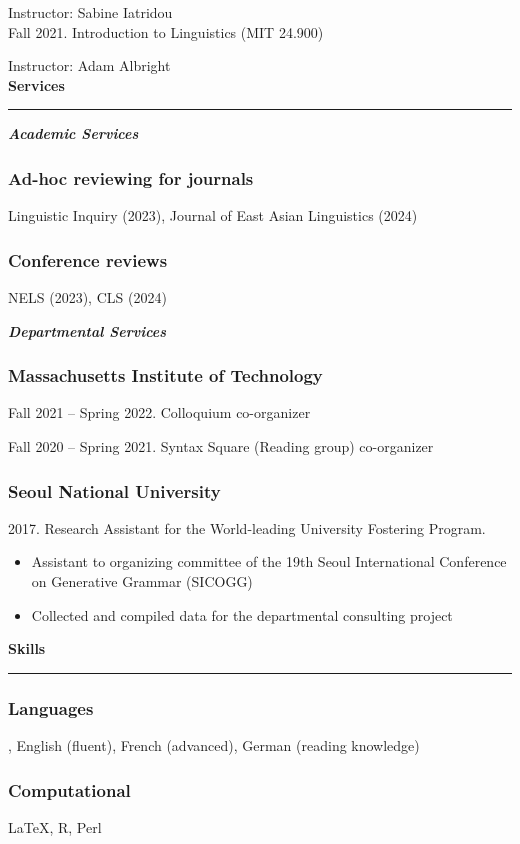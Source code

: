 \documentclass[11pt]{article}
\newcommand{\sect}[1]{{\fontsize{15}{25}\selectfont \textbf{#1}} {\vspace{0.1cm}} \hrule {\vspace{0.3cm}}}
\newcommand{\subsect}[1]{{\fontsize{12}{18}\selectfont \textit{\textbf{#1}}} {\vspace{0.3cm}}}
\begin{document}
{\hphantom{Spring 2022.}} Instructor: Sabine Iatridou\\

Fall 2021. Introduction to Linguistics (MIT 24.900)

{\hphantom{Fall 2021.}} Instructor: Adam Albright\\

\sect{Services}

\subsect{Academic Services}

\vspace{-0.75cm}

\subsubsection*{Ad-hoc reviewing for journals}

Linguistic Inquiry (2023), Journal of East Asian Linguistics (2024)

\subsubsection*{Conference reviews}

NELS (2023), CLS (2024)

\vspace{\baselineskip}

\subsect{Departmental Services}

\vspace{-0.75cm}

\subsubsection*{Massachusetts Institute of Technology}
Fall 2021 -- Spring 2022. Colloquium co-organizer

Fall 2020 -- Spring 2021. Syntax Square (Reading group) co-organizer

\subsubsection*{Seoul National University}
{2017. Research Assistant for the World-leading University Fostering Program.

\begin{itemize}[leftmargin=15pt, topsep=0pt, itemsep=0pt, parsep=0pt]
	\item{{\small Assistant to organizing committee of the 19th Seoul International Conference on Generative Grammar (SICOGG)}}
	\item{{\small Collected and compiled data for the departmental consulting project}}
\end{itemize}
}

\vspace{1cm}

\sect{Skills}

\subsubsection*{Languages}
, English (fluent), French (advanced), German (reading knowledge)
\subsubsection*{Computational}
 {\LaTeX}, R, Perl
\end{document}
